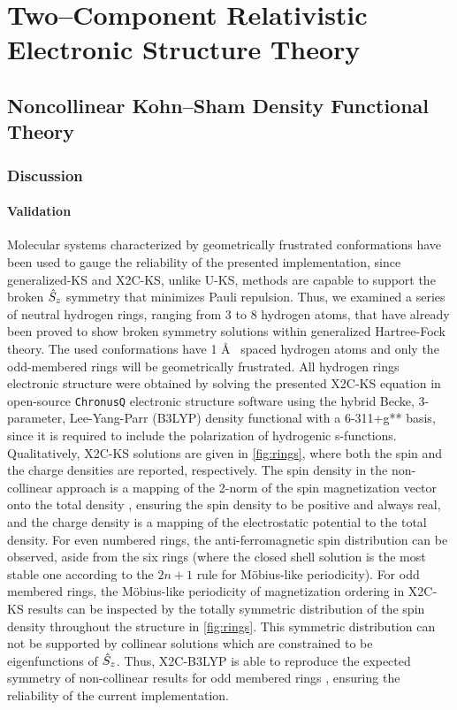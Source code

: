\chapter{Two--Component Relativistic Electronic Structure Theory}

\section{Noncollinear Kohn--Sham Density Functional Theory}

\subsection{Discussion}
\subsubsection{Validation}
Molecular systems characterized by geometrically frustrated conformations have been used to gauge the reliability of the presented implementation, since generalized-KS  and X2C-KS, unlike U-KS, methods are capable to support the broken $\hat{S}_z$ symmetry that minimizes Pauli repulsion.\cite{Gross07_196405,Frisch07_125119,Frisch12_2193,Scuseria13_035117,Yamaguchi01_670,Blochl03_15772,Truhlar11_2629,Truhlar13_5349,Li15_154109}
Thus, we examined a series
of neutral hydrogen rings, ranging from 3 to 8 hydrogen atoms, that have already been proved to show broken symmetry solutions within generalized Hartree-Fock theory.\cite{Li15_154109}
The used conformations have 1 \AA~ spaced hydrogen atoms and only the  odd-membered rings will be geometrically frustrated.
All  hydrogen rings electronic structure were obtained by solving the presented X2C-KS
equation  in open-source \texttt{ChronusQ}\cite{chronusq_beta2} electronic structure software using the hybrid Becke, 3-parameter, Lee-Yang-Parr (B3LYP) density functional 
\cite{Becke93_5648,Parr88_785,Preuss89_200} with a 6-311+g** basis, since it is required to include the polarization of hydrogenic s-functions.\cite{Li15_154109}
Qualitatively,  X2C-KS solutions are given in \cref{fig:rings}, where both the spin and the charge densities are reported, respectively. The spin density in the non-collinear
approach is a mapping of the 2-norm of the spin magnetization vector onto the total density \cite{Wullen02_779}, ensuring the spin density to be positive and always real, and the charge density is a mapping of the electrostatic potential to the total density.
For even numbered rings, the anti-ferromagnetic
spin distribution can be observed, aside from the six rings (where the closed shell solution is the most stable one according to the $2n + 1$ rule for M\"obius-like periodicity).
For odd membered rings, the M\"obius-like periodicity of magnetization ordering
in X2C-KS results can be inspected by the totally symmetric distribution of the spin density throughout the structure in \cref{fig:rings}. This symmetric distribution can not be supported by collinear solutions\cite{Li15_154109} which are constrained to be eigenfunctions of $\hat{S}_z$. Thus, X2C-B3LYP  is able to reproduce the expected symmetry of non-collinear results for odd membered rings \cite{Li15_154109}, ensuring the reliability of the  current implementation.

